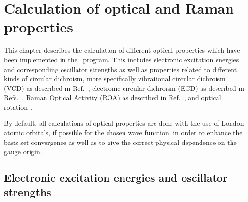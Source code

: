 \chapter{Calculation of optical and Raman properties}\label{ch:optchap}

This chapter describes the calculation of different optical properties
which have been implemented in the \dalton\ program. This
includes electronic excitation energies and corresponding oscillator
strengths as well as properties related to different kinds of circular
dichroism, more specifically vibrational circular dichroism
(VCD) as described in
Ref.~\cite{klbpjthkrhjajjcp98}, electronic circular dichroism
(ECD) as described in
Refs.~\cite{klbaehkrthjopjtca90,tbpaehcpl246}, Raman Optical Activity
(ROA) as described in
Ref.~\cite{thkrklbpjjofd99}, and optical
rotation~\cite{plpmp91,plpdkckrcpl319}.

By default, all calculations of optical properties are done with the
use of London atomic orbitals, if possible for
the chosen wave function, in order to enhance the basis set convergence
as well as to give the correct physical dependence on the gauge
origin.


\section{Electronic excitation energies and oscillator strengths}\label{sec:uvvis}

\begin{center}
\end{center}

